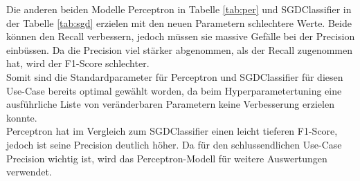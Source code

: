 Die anderen beiden Modelle Perceptron in Tabelle \cref{tab:per} und SGDClassifier in der Tabelle \cref{tab:sgd} erzielen mit den neuen Parametern schlechtere Werte.
Beide können den Recall verbessern, jedoch müssen sie massive Gefälle bei der Precision einbüssen.
Da die Precision viel stärker abgenommen, als der Recall zugenommen hat, wird der F1-Score schlechter.\\
Somit sind die Standardparameter für Perceptron und SGDClassifier für diesen \glqq Use-Case\grqq{} bereits optimal gewählt worden, da beim Hyperparametertuning eine ausführliche Liste von veränderbaren Parametern keine Verbesserung erzielen konnte.\\
Perceptron hat im Vergleich zum SGDClassifier einen leicht tieferen F1-Score, jedoch ist seine Precision deutlich höher.
Da für den schlussendlichen \glqq Use-Case\grqq{} Precision wichtig ist, wird das Perceptron-Modell für weitere Auswertungen verwendet.
